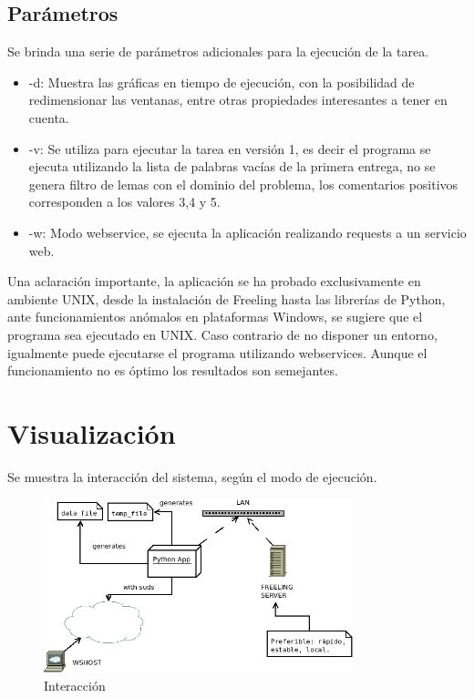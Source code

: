 \documentclass[12pt]{article}
\begin{document}
\subsection{Parámetros}
Se brinda una serie de parámetros adicionales para la ejecución de la tarea.
\begin{itemize}
  \item -d: Muestra las gráficas en tiempo de ejecución, con la posibilidad de redimensionar las ventanas, entre otras propiedades interesantes a tener en cuenta.
  \item -v: Se utiliza para ejecutar la tarea en versión 1, es decir el programa se ejecuta utilizando la lista de palabras vacías de la primera entrega, no se genera filtro de lemas con el dominio del problema, los comentarios positivos corresponden a los valores 3,4 y 5.
  \item -w: Modo webservice, se ejecuta la aplicación realizando requests a un servicio web.
\end{itemize}

Una aclaración importante, la aplicación se ha probado exclusivamente en ambiente UNIX, desde la instalación de Freeling hasta las librerías de Python, ante funcionamientos anómalos en plataformas Windows, se sugiere que el programa sea ejecutado en UNIX.
Caso contrario de no disponer un entorno, igualmente puede ejecutarse el programa utilizando webservices. Aunque el funcionamiento no es óptimo los resultados son semejantes.

\section{Visualización}
Se muestra la interacción del sistema, según el modo de ejecución.

\begin{figure}[!h]
  \centering
    \includegraphics[width=0.8\textwidth]{./fig/arq.png}
  \caption{Interacción}
  \label{fig:arq}
\end{figure} 
\end{document}
